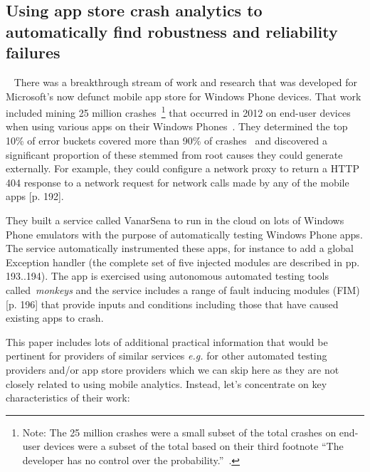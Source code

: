 \subsection{Using app store crash analytics to automatically find robustness and reliability failures}~\label{rw-windows-phone-store-crash-analysis-section}
There was a breakthrough stream of work and research that was developed for Microsoft's now defunct mobile app store for Windows Phone devices. That work included mining 25 million crashes~\footnote{Note: The 25 million crashes were a small subset of the total crashes on end-user devices were a subset of the total based on their third footnote ``The developer has no control over the probability.''~\cite[p. 191]{ravindrath2014_automatic_and_scalable_fault_detection_for_mobile_apps}.} that occurred in 2012 on end-user devices when using various apps on their Windows Phones~\cite[p. 190]{ravindrath2014_automatic_and_scalable_fault_detection_for_mobile_apps}. They determined the top 10\% of error buckets covered more than 90\% of crashes~\cite[p. 192]{ravindrath2014_automatic_and_scalable_fault_detection_for_mobile_apps} and discovered a significant proportion of these stemmed from root causes they could generate externally. For example, they could configure a network proxy to return a HTTP 404 response to a network request for network calls made by any of the mobile apps [p. 192].

They built a service called VanarSena to run in the cloud on lots of Windows Phone emulators with the purpose of automatically testing Windows Phone apps. The service automatically instrumented these apps, for instance to add a global Exception handler (the complete set of five injected modules are described in pp. 193..194). The app is exercised using autonomous automated testing tools called~\textit{monkeys} and the service includes a range of fault inducing modules (FIM) [p. 196] that provide inputs and conditions including those that have caused existing apps to crash. 

This paper includes lots of additional practical information that would be pertinent for providers of similar services \emph{e.g.} for other automated testing providers and/or app store providers which we can skip here as they are not closely related to using mobile analytics. Instead, let's concentrate on key characteristics of their work:

